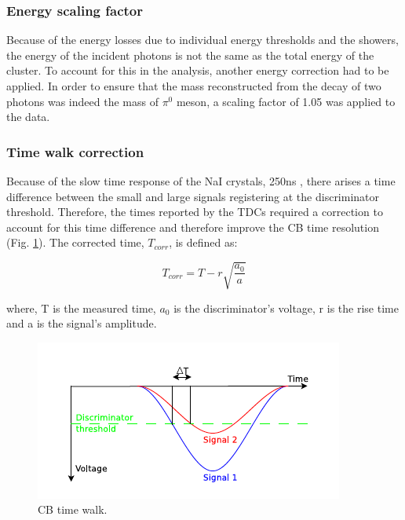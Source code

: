 \subsubsection{Energy scaling factor}

\indent Because of the energy losses due to individual energy thresholds and the showers, the energy of the incident photons is not the same as the total energy of the cluster. To account for this in the analysis, another energy correction had to be applied. In order to ensure that the mass reconstructed from the decay of two photons was indeed the mass of $\pi^{0}$ meson, a scaling factor of 1.05 was applied to the data.

\subsubsection{Time walk correction}

\indent Because of the slow time response of the NaI crystals, 250ns \cite{knoll}, there arises a time difference between the small and large signals registering at the discriminator threshold. Therefore, the times reported by the TDCs required a correction to account for this time difference and therefore improve the CB time resolution (Fig. \ref{cbtimewalk}). The corrected time, $T_{corr}$, is defined as:

\begin{equation}
T_{corr}=T - r\sqrt{\frac{a_{0}}{a}}
\end{equation}

where, T is the measured time, $a_{0}$ is the discriminator's voltage, r is the rise time and a is the signal's amplitude.

\begin{figure}[H]
\begin{center}
\includegraphics[scale=0.55]{pictures/png/cbtimewalk.png}
\caption{CB time walk.}
\label{cbtimewalk}
\end{center}
\end{figure}

